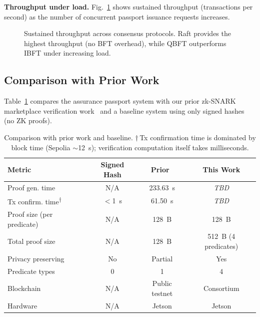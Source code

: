 \textbf{Throughput under load.}
Fig.~\ref{fig:throughput} shows sustained throughput (transactions per second) as the number of concurrent passport issuance requests increases.

\begin{figure}[t]
\centering
{}
\caption{Sustained throughput across consensus protocols. Raft provides the highest throughput (no BFT overhead), while QBFT outperforms IBFT under increasing load.}
\label{fig:throughput}
\end{figure}

\subsection{Comparison with Prior Work}
\label{sec:eval-comparison}

Table~\ref{tab:comparison} compares the assurance passport system with our prior zk-SNARK marketplace verification work~\cite{jagannath2025zksnark} and a baseline system using only signed hashes (no ZK proofs).

\begin{table}[t]
\centering
\caption{Comparison with prior work and baseline. $\dagger$\,Tx confirmation time is dominated by block time (Sepolia $\sim$12~s); verification computation itself takes milliseconds.}
\label{tab:comparison}
\begin{tabular}{lccc}
\toprule
\textbf{Metric} & \textbf{Signed Hash} & \textbf{Prior~\cite{jagannath2025zksnark}} & \textbf{This Work} \\
\midrule
Proof gen. time & N/A & 233.63~s & \textit{TBD} \\
Tx confirm. time\textsuperscript{$\dagger$} & $<$1~s & 61.50~s & \textit{TBD} \\
Proof size (per predicate) & N/A & 128~B & 128~B \\
Total proof size & N/A & 128~B & 512~B (4 predicates) \\
Privacy preserving & No & Partial & Yes \\
Predicate types & 0 & 1 & 4 \\
Blockchain & N/A & Public testnet & Consortium \\
Hardware & N/A & Jetson & Jetson \\
\bottomrule
\end{tabular}
\end{table}

